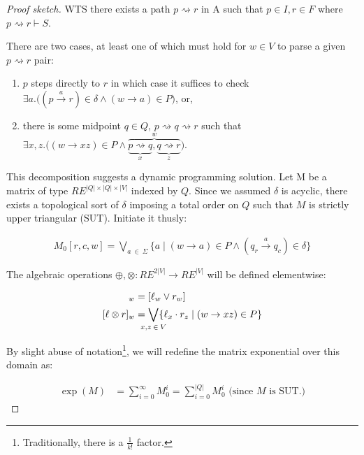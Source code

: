 \documentclass[sigplan,review,acmsmall,nonacm,screen,anonymous]{acmart}\settopmatter{printfolios=false,printccs=false,printacmref=false}
\begin{document}
  \begin{proof}[Proof sketch]
    WTS there exists a path $p \rightsquigarrow r$ in A such that $p\in I, r\in F$ where $p \rightsquigarrow r \vdash S$.\vspace{0.3cm}

    \noindent There are two cases, at least one of which must hold for $w \in V$ to parse a given $p \rightsquigarrow r$ pair:

    \begin{enumerate}
      \item $p$ steps directly to $r$ in which case it suffices to check $\exists a.\big((p \overset{a}{\rightarrow} r)\in \delta \land (w \rightarrow a) \in P\big)$, or,
      \item there is some midpoint $q \in Q$, $p \rightsquigarrow q \rightsquigarrow r$ such that $\exists x, z.\big((w \rightarrow xz) \in P\land\overbrace{\underbrace{p \rightsquigarrow q}_x, \underbrace{q \rightsquigarrow r}_z}^w\big)$.
    \end{enumerate}

    \noindent This decomposition suggests a dynamic programming solution. Let M be a matrix of type $RE^{|Q|\times|Q|\times|V|}$  indexed by $Q$. Since we assumed $\delta$ is acyclic, there exists a topological sort of $\delta$ imposing a total order on $Q$ such that $M$ is strictly upper triangular (SUT). Initiate it thusly:

    \begin{align}
      M_0[r, c, w] = \bigvee_{a\:\in\:\Sigma} \{a \mid (w \rightarrow a) \in P \land (q_r \overset{a}{\rightarrow} q_c)\in \delta\}
    \end{align}

    \noindent The algebraic operations $\oplus, \otimes: RE^{2|V|} \rightarrow RE^{|V|}$ will be defined elementwise:

    \begin{align}
      [\ell \oplus r]_w  &= [\ell_w \lor r_w]\\
      [\ell \otimes r]_w &= \bigvee_{\mathclap{x, z\:\in\:V}}\{\ell_x \cdot r_z \mid (w \rightarrow xz) \in P\}
    \end{align}

    \noindent By slight abuse of notation\footnote{Traditionally, there is a $\frac{1}{k!}$ factor.}, we will redefine the matrix exponential over this domain as:

    \begin{align}
      \exp(M) &= \sum_{i = 0}^\infty M_0^i = \sum_{i = 0}^{|Q|} M_0^i \text { (since $M$ is SUT.)}
    \end{align}


\end{proof}
\end{document}
